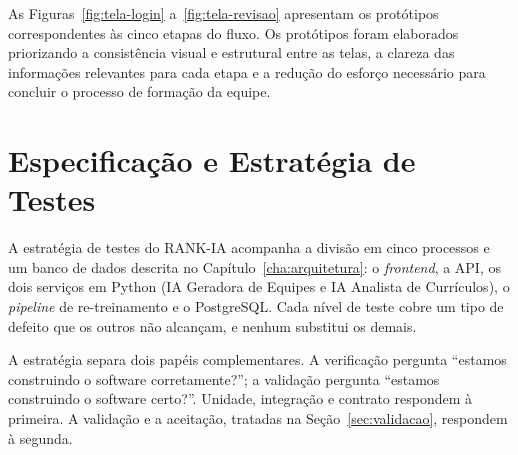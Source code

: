 \documentclass[a4paper,12pt,oneside,openany]{book}
\newif\iforientacoes
\newcommand{\orientacao}[1]{%
    \iforientacoes
        \begin{quote}
        \small\itshape\textbf{Orientação:} #1
        \end{quote}
    \fi
}
\begin{document}
As Figuras~\ref{fig:tela-login} a~\ref{fig:tela-revisao} apresentam os
protótipos correspondentes às cinco etapas do fluxo. Os protótipos foram
elaborados priorizando a consistência visual e estrutural entre as telas, a
clareza das informações relevantes para cada etapa e a redução do esforço
necessário para concluir o processo de formação da equipe.


%
%
%

\chapter{Especificação e Estratégia de Testes}\label{cha:testes}

\orientacao{Mostrem como a equipe pretende verificar o comportamento do
software e reduzir o risco de defeitos. O capítulo deve apresentar uma
estratégia coerente, e não apenas uma lista de ferramentas.}

A estratégia de testes do RANK-IA acompanha a divisão em cinco processos e um
banco de dados descrita no Capítulo~\ref{cha:arquitetura}: o
\textit{frontend}, a API, os dois serviços em Python (IA Geradora de Equipes e
IA Analista de Currículos), o \textit{pipeline} de re-treinamento e o PostgreSQL. Cada nível de teste cobre um tipo de
defeito que os outros não alcançam, e nenhum substitui os demais.

A estratégia separa dois papéis complementares. A verificação pergunta
``estamos construindo o software corretamente?''; a validação pergunta
``estamos construindo o software certo?''. Unidade, integração e contrato
respondem à primeira. A validação e a aceitação, tratadas na
Seção~\ref{sec:validacao}, respondem à segunda.
\end{document}
